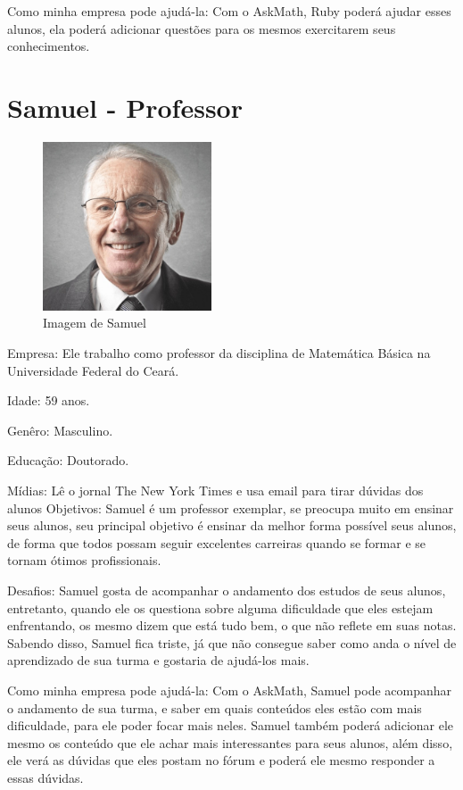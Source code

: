 Como minha empresa pode ajudá-la: Com o AskMath, Ruby poderá ajudar esses 
alunos, ela poderá adicionar questões para os mesmos exercitarem 
seus conhecimentos.

\section{Samuel - Professor}

\begin{figure}[H]
\centering
\includegraphics[width=5cm]{figuras/personas/figura_persona_3}
\caption{Imagem de Samuel}
\label{figura_persona_3}
\end{figure}

Empresa: Ele trabalho como professor da disciplina de Matemática Básica na
Universidade Federal do Ceará.

Idade: 59 anos.

Genêro: Masculino.

Educação: Doutorado.

Mídias: Lê o jornal The New York Times e usa email para tirar dúvidas dos alunos
Objetivos: Samuel é um professor exemplar, se preocupa muito em ensinar seus 
alunos, seu principal objetivo é ensinar da melhor forma possível seus alunos, 
de forma que todos possam seguir excelentes carreiras quando se formar e se 
tornam ótimos profissionais.

Desafios: Samuel gosta de acompanhar o andamento dos estudos de seus alunos,
entretanto, quando ele os questiona sobre alguma dificuldade que eles estejam
enfrentando, os mesmo dizem que está tudo bem, o que não reflete em suas notas.
Sabendo disso, Samuel fica triste, já que não consegue saber como anda o nível 
de aprendizado de sua turma e gostaria de ajudá-los mais.

Como minha empresa pode ajudá-la: Com o AskMath, Samuel pode acompanhar o
andamento de sua turma, e saber em quais conteúdos eles estão com mais 
dificuldade, para ele poder focar mais neles. Samuel também poderá adicionar 
ele mesmo os conteúdo que ele achar mais interessantes para seus alunos, além 
disso, ele verá as dúvidas que eles postam no fórum e poderá ele mesmo 
responder a essas dúvidas.

